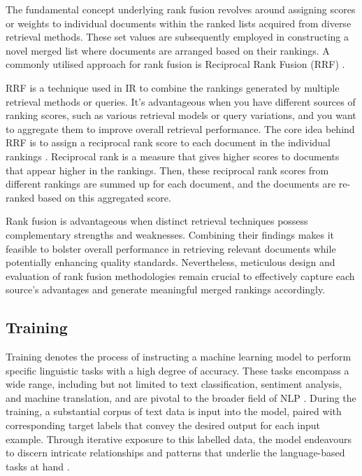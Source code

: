 The fundamental concept underlying rank fusion revolves around assigning scores or weights to individual documents within the ranked lists acquired from diverse retrieval methods. These set values are subsequently employed in constructing a novel merged list where documents are arranged based on their rankings. A commonly utilised approach for rank fusion is Reciprocal Rank Fusion (RRF) \cite{rankfusion}.

RRF is a technique used in IR to combine the rankings generated by multiple retrieval methods or queries. It's advantageous when you have different sources of ranking scores, such as various retrieval models or query variations, and you want to aggregate them to improve overall retrieval performance. The core idea behind RRF is to assign a reciprocal rank score to each document in the individual rankings \cite{rankfusion}. Reciprocal rank is a measure that gives higher scores to documents that appear higher in the rankings. Then, these reciprocal rank scores from different rankings are summed up for each document, and the documents are re-ranked based on this aggregated score.

Rank fusion is advantageous when distinct retrieval techniques possess complementary strengths and weaknesses. Combining their findings makes it feasible to bolster overall performance in retrieving relevant documents while potentially enhancing quality standards. Nevertheless, meticulous design and evaluation of rank fusion methodologies remain crucial to effectively capture each source's advantages and generate meaningful merged rankings accordingly.

\subsection{Training}
Training denotes the process of instructing a machine learning model to perform specific linguistic tasks with a high degree of accuracy. These tasks encompass a wide range, including but not limited to text classification, sentiment analysis, and machine translation, and are pivotal to the broader field of NLP \cite{bert}. During the training, a substantial corpus of text data is input into the model, paired with corresponding target labels that convey the desired output for each input example. Through iterative exposure to this labelled data, the model endeavours to discern intricate relationships and patterns that underlie the language-based tasks at hand \cite{nlp}.

